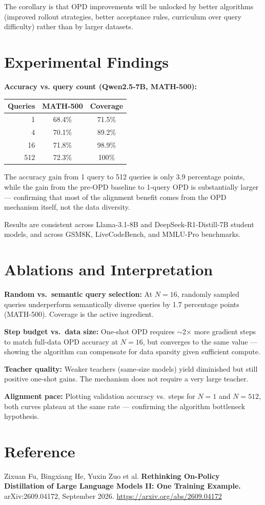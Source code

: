 \documentclass[10pt,twocolumn]{article}
\begin{document}
The corollary is that OPD improvements will be unlocked by better
algorithms (improved rollout strategies, better acceptance rules,
curriculum over query difficulty) rather than by larger datasets.

\section{Experimental Findings}

\textbf{Accuracy vs. query count (Qwen2.5-7B, MATH-500):}

\begin{center}
\begin{tabular}{rcc}
\toprule
Queries & MATH-500 & Coverage \\
\midrule
1       & 68.4\%   & 71.5\% \\
4       & 70.1\%   & 89.2\% \\
16      & 71.8\%   & 98.9\% \\
512     & 72.3\%   & 100\%  \\
\bottomrule
\end{tabular}
\end{center}

The accuracy gain from 1 query to 512 queries is only 3.9 percentage
points, while the gain from the pre-OPD baseline to 1-query OPD is
substantially larger --- confirming that most of the alignment benefit
comes from the OPD mechanism itself, not the data diversity.

Results are consistent across Llama-3.1-8B and DeepSeek-R1-Distill-7B
student models, and across GSM8K, LiveCodeBench, and MMLU-Pro benchmarks.

\section{Ablations and Interpretation}

\textbf{Random vs.\ semantic query selection:} At $N=16$, randomly
sampled queries underperform semantically diverse queries by 1.7
percentage points (MATH-500). Coverage is the active ingredient.

\textbf{Step budget vs.\ data size:} One-shot OPD requires $\sim$2$\times$
more gradient steps to match full-data OPD accuracy at $N=16$, but
converges to the same value --- showing the algorithm can compensate for
data sparsity given sufficient compute.

\textbf{Teacher quality:} Weaker teachers (same-size models) yield
diminished but still positive one-shot gains. The mechanism does not
require a very large teacher.

\textbf{Alignment pace:} Plotting validation accuracy vs.\ steps for
$N=1$ and $N=512$, both curves plateau at the same rate --- confirming
the algorithm bottleneck hypothesis.

\section*{Reference}

Zixuan Fu, Bingxiang He, Yuxin Zuo et al.
\textbf{Rethinking On-Policy Distillation of Large Language Models II:
One Training Example.}
arXiv:2609.04172, September 2026.
\url{https://arxiv.org/abs/2609.04172}
\end{document}
